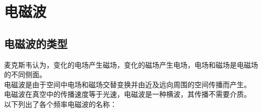 \documentclass[UTF8]{ctexart}
\begin{document}

\section{电磁波}

\subsection{电磁波的类型}
    麦克斯韦认为，变化的电场产生磁场，变化的磁场产生电场，电场和磁场是电磁场的不同侧面。\\[3mm]
    电磁波是由于空间中电场和磁场交替变换并由近及远向周围的空间传播而产生。\\[3mm]
    电磁波在真空中的传播速度等于光速，电磁波是一种横波，其传播不需要介质。\\[5mm]
    以下列出了各个频率电磁波的名称：\vspace{5pt}
\end{document}
